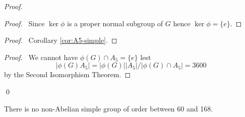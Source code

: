\begin{proof}
\pf
{}
\begin{proof}
	\pf\ Since $\ker \phi$ is a proper normal subgroup of $G$ hence $\ker \phi = \{e\}$.
\end{proof}
\begin{proof}
	\pf\ Corollary \ref{cor:A5-simple}.
\end{proof}
\begin{proof}
	\pf\ We cannot have $\phi(G) \cap A_5 = \{e\}$ lest
	\[ |\phi(G) A_5| = |\phi(G)||A_5| / |\phi(G) \cap A_5| = 3600 \]
	by the Second Isomorphism Theorem.
\end{proof}
\qed
\end{proof}

\begin{prop}
There is no non-Abelian simple group of order between 60 and 168.
\end{prop}

